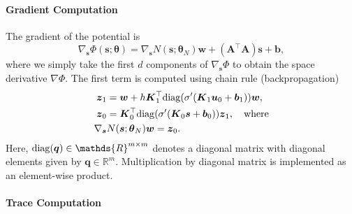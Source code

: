 \documentclass[letterpaper]{article}
\newcommand{\bfth}{\boldsymbol{\theta}}
\newcommand{\bfb}{\boldsymbol{b}}
\newcommand{\bfq}{\boldsymbol{q}}
\newcommand{\bfs}{\boldsymbol{s}}
\newcommand{\bfu}{\boldsymbol{u}}
\newcommand{\bfw}{\boldsymbol{w}}
\newcommand{\bfz}{\boldsymbol{z}}
\newcommand{\bfA}{\boldsymbol{A}}
\newcommand{\bfK}{\boldsymbol{K}}
\newcommand{\R}{\ensuremath{\mathds{R}}}
\newcommand{\bbR}{\R}
\begin{document}
\paragraph{Gradient Computation}
	The gradient of the potential is 
	\begin{equation}\label{eq:DPhi}
	    \nabla_{\bfs} \Phi(\bfs;\bfth)  = \nabla_{\bfs} N(\bfs;\bfth_N) \bfw + (\bfA^\top \bfA) \bfs + \bfb,
	\end{equation}
	where we simply take the first $d$ components of $\nabla_{\bfs} \Phi$ to obtain the space derivative $\nabla \Phi$.
	The first term is computed using chain rule (backpropagation)
	\begin{equation}
	  \begin{split}
	      \bfz_{1} &= \bfw + h  \bfK_{1}^\top {\rm diag}(\sigma'(\bfK_{1} \bfu_{0} + \bfb_{1})) \bfw,
	      \\  
	      \bfz_0 &= \bfK_{0}^\top {\rm diag}(\sigma'(\bfK_{0} \bfs + \bfb_{0})) \bfz_1, \quad \text{where}\\
	      \nabla_{\bfs} &N(\bfs;\bfth_N) \bfw = \bfz_{0}.
	  \end{split}
	\end{equation}
	Here, ${\rm diag}(\bfq) \in\bbR^{m\times m}$ denotes a diagonal matrix with diagonal elements given by $\bfq \in \R^m$. Multiplication by diagonal matrix is implemented as an element-wise product.



\paragraph{Trace Computation} 
\end{document}
